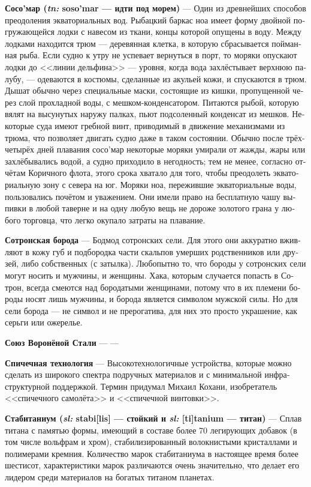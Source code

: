 \documentclass[a4paper,12pt,fleqn]{book}\usepackage{polyglossia}\setdefaultlanguage[babelshorthands=true]{russian}\setotherlanguage{english}\defaultfontfeatures{Ligatures=TeX,Mapping=tex-text}\usepackage{xcolor}\newcommand{\ml}[3]{#2}
\newcommand{\theterm}[3]{\textbf{\hypertarget{#1}{#2}} --- #3}
\newcommand{\theorigin}[3]{\textit{#1:} #2 --- #3}
\begin{document}
{\theterm{soso-mar}
{Сосо'мар (\theorigin{tn}{soso'mar}{идти под морем})}
{Один из древнейших способов преодоления экваториальных вод.
Рыбацкий баркас ноа имеет форму двойной погружающейся лодки с навесом из ткани, концы которой опущены в воду.
Между лодками находится трюм --- деревянная клетка, в которую сбрасывается пойманная рыба.
Если судно к утру не успевает вернуться в порт, то моряки опускают лодки до <<линии дельфина>> --- уровня, когда вода захлёстывает верхнюю палубу, --- одеваются в костюмы, сделанные из акульей кожи, и спускаются в трюм.
Дышат обычно через специальные маски, состоящие из кишки, пропущенной через слой прохладной воды, с мешком-конденсатором.
Питаются рыбой, которую вялят на высунутых наружу палках, пьют подсоленный конденсат из мешков.
Некоторые суда имеют гребной винт, приводимый в движение механизмами из трюма, что позволяет двигать судно даже в таком состоянии.
Обычно после трёх-четырёх дней плавания сосо'мар некоторые моряки умирали от жажды, жары или захлёбывались водой, а судно приходило в негодность;
тем не менее, согласно отчётам Коричного флота, этого срока хватало для того, чтобы преодолеть экваториальную зону с севера на юг.
Моряки ноа, пережившие экваториальные воды, пользовались почётом и уважением.
Они имели право на бесплатную чашу выпивки в любой таверне и на одну любую вещь не дороже золотого грана у любого торговца, что легко окупало затраты на плавание.}

\theterm{sotron-beard}
{Сотронская борода}
{Бодмод сотронских сели.
Для этого они аккуратно вживляют в кожу губ и подбородка части скальпов умерших родственников или друзей, либо собственных (с затылка).
Любопытно то, что бороды у сотронских сели могут носить и мужчины, и женщины.
Хака, которым случается попасть в Сотрон, всегда смеются над бородатыми женщинами, потому что в их племени бороды носят лишь мужчины, и борода является символом мужской силы.
Но для сели борода --- не символ и не прерогатива, для них это просто украшение, как серьги или ожерелье.}

\theterm{blued-steel-union} %
{Союз Воронёной Стали}
{---}

\theterm{match-tech}
{Спичечная технология}
{Высокотехнологичные устройства, которые можно сделать из широкого спектра подручных материалов и с минимальной инфраструктурной поддержкой.
Термин придумал Михаил Кохани, изобретатель <<спичечного самолёта>> и <<спичечной винтовки>>.}

\theterm{stabitanium}
{Стабитаниум (\theorigin{sl}{stabi[lis]}{стойкий} и \theorigin{sl}{[ti]tanium}{титан})}
{Сплав титана с памятью формы, имеющий в составе более 70 легирующих добавок (в том числе вольфрам и хром), стабилизированный волокнистыми кристаллами и полимерами кремния.
Количество марок стабитаниума в настоящее время более шестисот, характеристики марок различаются очень значительно, что делает его лидером среди материалов на богатых титаном планетах.}

}
\end{document}
